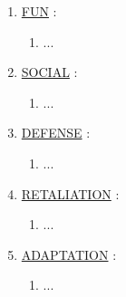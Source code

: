 \documentclass[11pt]{article}
\begin{document}
\begin{enumerate}
	\item[] \ul{FUN} :
	\begin{enumerate}
		\item[] ...
	\end{enumerate}

	\item[] \ul{SOCIAL} :
	\begin{enumerate}
		\item[] ...
	\end{enumerate}

	\item[] \ul{DEFENSE} :
	\begin{enumerate}
		\item[] ...
	\end{enumerate}

	\item[] \ul{RETALIATION} :
	\begin{enumerate}
		\item[] ...
	\end{enumerate}

	\item[] \ul{ADAPTATION} :
	\begin{enumerate}
		\item[] ...
	\end{enumerate}

\end{enumerate}
\end{document}

